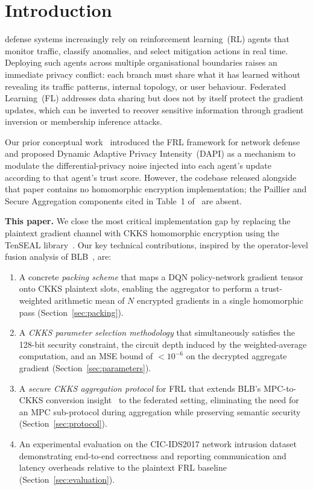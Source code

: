 \documentclass[letterpaper,journal]{IEEEtran}
\begin{document}
\section{Introduction}\label{sec:introduction}

 defense systems increasingly rely on reinforcement
learning~(RL) agents that monitor traffic, classify anomalies, and select
mitigation actions in real time.
Deploying such agents across multiple organisational boundaries raises an
immediate privacy conflict: each branch must share what it has learned without
revealing its traffic patterns, internal topology, or user behaviour.
Federated Learning~(FL) addresses data sharing but does not by itself protect
the gradient updates, which can be inverted to recover sensitive information
through gradient inversion or membership inference attacks.

Our prior conceptual work~\cite{frlconf2026} introduced the FRL framework for
network defense and proposed Dynamic Adaptive Privacy Intensity~(DAPI) as a
mechanism to modulate the differential-privacy noise injected into each agent's
update according to that agent's trust score.
However, the codebase released alongside that paper contains no homomorphic
encryption implementation; the Paillier and Secure Aggregation components cited
in Table~1 of~\cite{frlconf2026} are absent.

\textbf{This paper.}
We close the most critical implementation gap by replacing the plaintext
gradient channel with CKKS homomorphic encryption using the TenSEAL
library~\cite{tenseal}.
Our key technical contributions, inspired by the operator-level fusion
analysis of BLB~\cite{blb2025}, are:

\begin{enumerate}
  \item A concrete \emph{packing scheme} that maps a DQN policy-network
        gradient tensor onto CKKS plaintext slots, enabling the aggregator
        to perform a trust-weighted arithmetic mean of $N$ encrypted gradients
        in a single homomorphic pass (Section~\ref{sec:packing}).
  \item A \emph{CKKS parameter selection methodology} that simultaneously
        satisfies the 128-bit security constraint, the circuit depth induced
        by the weighted-average computation, and an MSE bound of
        $< 10^{-6}$ on the decrypted aggregate gradient
        (Section~\ref{sec:parameters}).
  \item A \emph{secure CKKS aggregation protocol} for FRL that extends
        BLB's MPC-to-CKKS conversion insight~\cite{blb2025} to the federated
        setting, eliminating the need for an MPC sub-protocol during aggregation
        while preserving semantic security
        (Section~\ref{sec:protocol}).
  \item An experimental evaluation on the CIC-IDS2017 network intrusion
        dataset demonstrating end-to-end correctness and reporting communication
        and latency overheads relative to the plaintext FRL baseline
        (Section~\ref{sec:evaluation}).
\end{enumerate}
\end{document}
